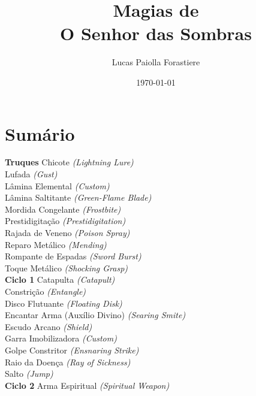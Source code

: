 \documentclass{RPG_Adventure}[2021/10/20]
\title{Magias de\\ \Huge{O Senhor das Sombras}}
\date{\today}
\author{Lucas Paiolla Forastiere}
\begin{document}
\maketitle

\chapter{Sumário}\n\n\noindent\textbf{Truques}
{\normalsize Chicote \textit{(Lightning Lure)}\\ }
{\normalsize Lufada \textit{(Gust)}\\ }
{\normalsize Lâmina Elemental \textit{(Custom)}\\ }
{\normalsize Lâmina Saltitante \textit{(Green-Flame Blade)}\\ }
{\normalsize Mordida Congelante \textit{(Frostbite)}\\ }
{\normalsize Prestidigitação \textit{(Prestidigitation)}\\ }
{\normalsize Rajada de Veneno \textit{(Poison Spray)}\\ }
{\normalsize Reparo Metálico \textit{(Mending)}\\ }
{\normalsize Rompante de Espadas \textit{(Sword Burst)}\\ }
{\normalsize Toque Metálico \textit{(Shocking Grasp)}\\ }
\jump\noindent\textbf{Ciclo 1}
{\normalsize Catapulta \textit{(Catapult)}\\ }
{\normalsize Constrição \textit{(Entangle)}\\ }
{\normalsize Disco Flutuante \textit{(Floating Disk)}\\ }
{\normalsize Encantar Arma (Auxílio Divino) \textit{(Searing Smite)}\\ }
{\normalsize Escudo Arcano \textit{(Shield)}\\ }
{\normalsize Garra Imobilizadora \textit{(Custom)}\\ }
{\normalsize Golpe Constritor \textit{(Ensnaring Strike)}\\ }
{\normalsize Raio da Doença \textit{(Ray of Sickness)}\\ }
{\normalsize Salto \textit{(Jump)}\\ }
\jump\noindent\textbf{Ciclo 2}
{\normalsize Arma Espiritual \textit{(Spiritual Weapon)}\\ }
\end{document}
